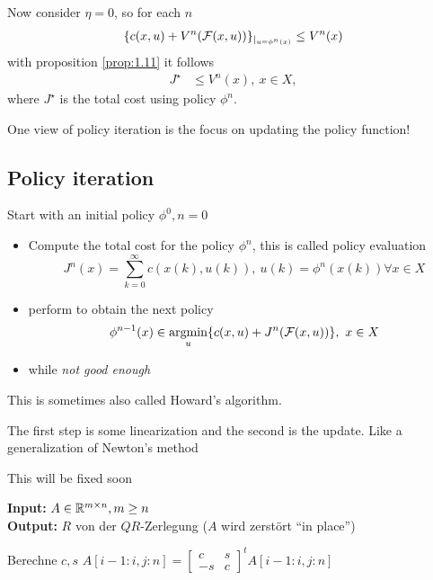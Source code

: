 Now consider \(\eta=0\), so for each \(n\)
\begin{align*}
    \{c(x,u)+V^n(\mathcal{F}(x,u))\}_{|_{u=\phi^n(x)}}\leq V^n(x)
\end{align*}
with proposition \ref{prop:1.11} it follows 
\begin{align*}
    J^\star &\leq V^n(x),\ x\in X,   
\end{align*}
where \(J^\star\) is the total cost using policy \(\phi^n\).

One view of policy iteration is the focus on updating the policy function!

\subsection{Policy iteration}

Start with an initial policy \(\phi^0,n=0\)
\begin{itemize}
    \item Compute the total cost for the policy \(\phi^n\), this is called policy evaluation
    \[J^n(x)=\sum_{k=0}^\infty c(x(k),u(k)),\ u(k)=\phi^n(x(k))\forall x\in X\]
    \item perform  to obtain the next policy 
    \[\phi^{n-1}(x)\in \operatorname*{\text{argmin}}_{u}\{c(x,u)+J^n(\mathcal{F}(x,u))\},\ x\in X\]
    \item while \textit{not good enough}
\end{itemize}

This is sometimes also called Howard's algorithm.

\begin{remark}
    The first step is some linearization and the second is the update. Like a generalization of Newton's method    
\end{remark}

\begin{algorithm}[H]
    \caption{This will be fixed soon}
    \textbf{Input:} $A\in\mathbb{R}^{m\times n},m\geq n$\\
    \textbf{Output:} $R$ von der $QR$-Zerlegung ($A$ wird zerstört ``in place'')
    \begin{algorithmic}
            \State Berechne $c,s$
            \State $A[i-1:i,j:n]=\begin{bmatrix}
                c & s \\
                -s & c 
            \end{bmatrix}^t A[i-1:i,j:n]$
        \EndFor
    \EndFor
    \end{algorithmic}
\end{algorithm}

